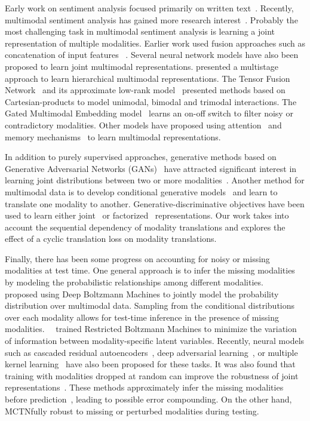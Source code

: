 \documentclass[letterpaper]{article} %
\newcommand{\citet}[1]{\citeauthor{#1}~\shortcite{#1}}
\newcommand{\citep}{\cite}
\newcommand{\ours}{MCTN}
\begin{document}
Early work on sentiment analysis focused primarily on written text~\citep{Pang:2002:TUS:1118693.1118704,pang2008opinion,socher2013recursive}. Recently, multimodal sentiment analysis has gained more research interest~\citep{mm_survey}.  Probably the most challenging task in multimodal sentiment analysis is learning a joint representation of multiple modalities. Earlier work used fusion approaches such as concatenation of input features ~\citep{ngiam2011multimodal,lazaridou2015combining}. Several neural network models have also been proposed to learn joint multimodal representations. \citep{multistage} presented a multistage approach to learn hierarchical multimodal representations. The Tensor Fusion Network~\citep{tensoremnlp17} and its approximate low-rank model~\citep{lowrank} presented methods based on Cartesian-products to model unimodal, bimodal and trimodal interactions. The Gated Multimodal Embedding model~\citep{chen2017msa} learns an on-off switch to filter noisy or contradictory modalities. Other models have proposed using attention~\citep{Cheng:2017:HMA:3077136.3080671} and memory mechanisms~\citep{zadeh2018memory} to learn multimodal representations.

In addition to purely supervised approaches, generative methods based on Generative Adversarial Networks (GANs)~\citep{gan} have attracted significant interest in learning joint distributions between two or more modalities~\citep{bigan,triplegan}. 
%
Another method for multimodal data is to develop conditional generative models~\citep{conditionalvae,variationalmultimodal} and learn to translate one modality to another. Generative-discriminative objectives have been used to learn either joint~\citep{seq2seq,kiros2014unifying} or factorized~\citep{factorized} representations. Our work takes into account the sequential dependency of modality translations and explores the effect of a cyclic translation loss on modality translations.

Finally, there has been some progress on accounting for noisy or missing modalities at test time. One general approach is to infer the missing modalities by modeling the probabilistic relationships among different modalities.~\citet{JMLR:v15:srivastava14b} proposed using Deep Boltzmann Machines to jointly model the probability distribution over multimodal data. Sampling from the conditional distributions over each modality allows for test-time inference in the presence of missing modalities.~\citet{NIPS2014_5279} trained Restricted Boltzmann Machines to minimize the variation of information between modality-specific latent variables. Recently, neural models such as cascaded residual autoencoders~\citep{DBLP:conf/cvpr/Tran0ZJ17}, deep adversarial learning~\citep{Cai:2018:DAL:3219819.3219963}, or multiple kernel learning~\citep{10.1007/978-3-642-15549-9_49} have also been proposed for these tasks. It was also found that training with modalities dropped at random can improve the robustness of joint representations~\citep{ngiam2011multimodal}. These methods approximately infer the missing modalities before prediction~\citep{Q14-1023,AAAI1714811}, leading to possible error compounding. On the other hand, \ours \remains fully robust to missing or perturbed modalities during testing. 
\end{document}
